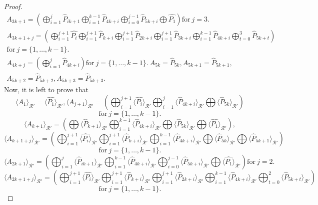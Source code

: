 \documentclass[10pt,a4paper]{amsart}
\begin{document}
\begin{proof}
\begin{gather*}
         A_{3k+1} =  \left( \bigoplus_{i=1}^{j}  \hat{P}_{ik+1}  \bigoplus_{i=1}^{k-1}  \hat{P}_{4k+i} \bigoplus_{i=0}^{j-1}  \hat{P}_{5k+i} \bigoplus  \hat{P_{1}}   \right) \text{for} ~ j =3. \\
         A_{3k+1+j} = \left( \bigoplus_{i=1}^{j+1} \hat{P_{i}}  \bigoplus_{i=1}^{j+1}  \hat{P}_{k+i}   \bigoplus_{i=1}^{j+1}  \hat{P}_{2k+i}  \bigoplus_{i=1}^{j+1}  \hat{P}_{3k+i}  \bigoplus_{i=1}^{k-1}  \hat{P}_{4k+i}  \bigoplus_{t=0}^{3} \hat{P}_{5k+t}    \right) \\ \text{for}~ j = \{1,\dots,k-1\}. \\
         A_{4k+j} = \left( \bigoplus_{i=1}^{j} \hat{P}_{4k+i}  \right) \text{for}~ j = \{1,\dots,k-1\}.~ A_{5k}=  \hat{P}_{5k}, A_{5k+1}=  \hat{P}_{5k+1}, \\ A_{5k+2}=  \hat{P}_{5k+2}, A_{5k+3}=   \hat{P}_{5k+3}.
    \end{gather*}
    Now, it is left to prove that
    \allowdisplaybreaks
        $$\langle A_1 \rangle_{\mathcal{R}'} = \langle \hat{P_{1}} \rangle_{\mathcal{R}'},\langle  A_{j+1} \rangle_{\mathcal{R}'} = \left( \bigoplus_{i=1}^{j+1} \langle \hat{P_i} \rangle_{\mathcal{R}'} \bigoplus_{i=1}^{j} \langle \hat{P}_{4k+i} \rangle_{\mathcal{R}'} \bigoplus \langle \hat{P}_{5k} \rangle_{\mathcal{R}'}  \right) $$  $$\text{for} ~ j = \{1,\dots,k-1\}.$$ 
        $$ \langle  A_{k+1} \rangle_{\mathcal{R}'} = \left( \bigoplus \langle \hat{P}_{k+1} \rangle_{\mathcal{R}'} \bigoplus_{i=1}^{k-1} \langle \hat{P}_{4k+i} \rangle_{\mathcal{R}'} \bigoplus \langle \hat{P}_{5k} \rangle_{\mathcal{R}'} \bigoplus \langle \hat{P_{1}} \rangle_{\mathcal{R}'}  \right), $$
       $$ \langle  A_{k+1+j} \rangle_{\mathcal{R}'} = \left( \bigoplus_{i=1}^{j+1} \langle \hat{P_{i}} \rangle_{\mathcal{R}'} \bigoplus_{i=1}^{j+1} \langle \hat{P}_{k+i} \rangle_{\mathcal{R}'} \bigoplus_{i=1}^{k-1} \langle \hat{P}_{4k+i} \rangle_{\mathcal{R}'} \bigoplus \langle \hat{P}_{5k} \rangle_{\mathcal{R}'} \bigoplus \langle \hat{P}_{5k+1} \rangle_{\mathcal{R}'}  \right) $$ $$ \text{for} ~ j = \{1,\dots,k-1\}. $$ 
       $$ \langle  A_{2k+1} \rangle_{\mathcal{R}'} =   \left( \bigoplus_{i=1}^{j} \langle \hat{P}_{ik+1} \rangle_{\mathcal{R}'} \bigoplus_{i=1}^{k-1} \langle \hat{P}_{4k+i} \rangle_{\mathcal{R}'} \bigoplus_{i=0}^{j-1} \langle \hat{P}_{5k+i} \rangle_{\mathcal{R}'} \bigoplus \langle \hat{P_{1}} \rangle_{\mathcal{R}'}  \right) \text{for} ~ j =2.$$ 
       $$ \langle  A_{2k+1+j} \rangle_{\mathcal{R}'} = \left( \bigoplus_{i=1}^{j+1} \langle \hat{P_{i}} \rangle_{\mathcal{R}'} \bigoplus_{i=1}^{j+1} \langle \hat{P}_{k+i} \rangle_{\mathcal{R}'}  \bigoplus_{i=1}^{j+1} \langle \hat{P}_{2k+i} \rangle_{\mathcal{R}'} \bigoplus_{i=1}^{k-1} \langle \hat{P}_{4k+i} \rangle_{\mathcal{R}'} \bigoplus_{t=0}^{2} \langle \hat{P}_{5k+t} \rangle_{\mathcal{R}'}   \right) $$  $$\text{for} ~ j = \{1,\dots,k-1\}. $$

\end{proof}
\end{document}
